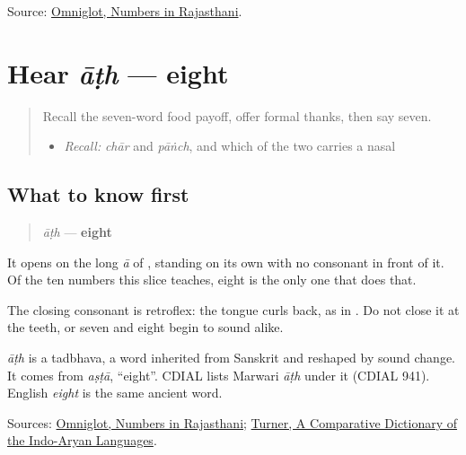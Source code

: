 \begin{tcolorbox}[breakable,colback=teal!4,colframe=teal!35!black,title={Before you move on}]
Source: \href{https://www.omniglot.com/language/numbers/rajasthani.htm}{Omniglot, Numbers in Rajasthani}.
\end{tcolorbox}
\section[āṭh]{Hear \emph{āṭh} — eight}

\label{lesson:MW-C33-hear-aath}



\begin{quote}
Recall the seven-word food payoff, offer formal thanks, then say seven.

\begin{itemize}
\raggedright
  \item \emph{Recall:} \emph{chār} and \emph{pāṅch}, and which of the two carries a nasal
\end{itemize}
\end{quote}

\subsection*{What to know first}
\begin{quote}
\emph{āṭh} — \textbf{eight}
\end{quote}

It opens on the long \emph{ā} of \textbf{}, standing on its own with no consonant in front of it. Of the ten numbers this slice teaches, eight is the only one that does that.

The closing consonant is retroflex: the tongue curls back, as in \textbf{}. Do not close it at the teeth, or seven and eight begin to sound alike.

\begin{cousinweb}
\emph{āṭh} is a tadbhava, a word inherited from Sanskrit and reshaped by sound change. It comes from \emph{aṣṭā}, \textquotedblleft{}eight\textquotedblright{}. CDIAL lists Marwari \emph{āṭh} under it (CDIAL 941). English \emph{eight} is the same ancient word.
\end{cousinweb}

\begin{tcolorbox}[breakable,colback=teal!4,colframe=teal!35!black,title={Before you move on}]
Sources: \href{https://www.omniglot.com/language/numbers/rajasthani.htm}{Omniglot, Numbers in Rajasthani}; \href{https://dsal.uchicago.edu/dictionaries/soas/}{Turner, A Comparative Dictionary of the Indo-Aryan Languages}.
\end{tcolorbox}
